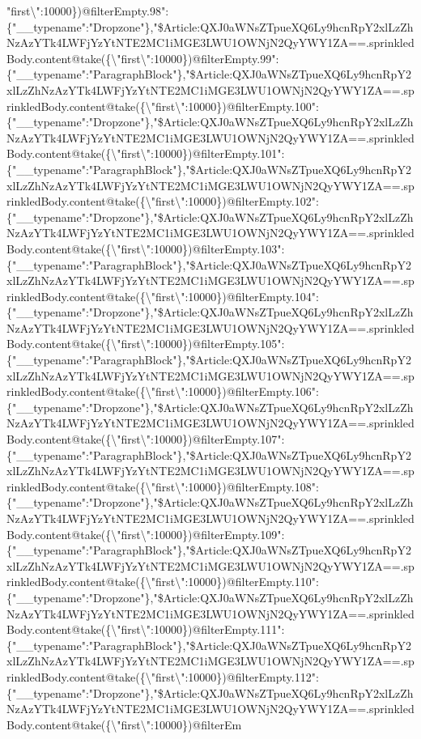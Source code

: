 "first\textbackslash{}":10000\})@filterEmpty.98":\{"\_\_typename":"Dropzone"\},"\$Article:QXJ0aWNsZTpueXQ6Ly9hcnRpY2xlLzZhNzAzYTk4LWFjYzYtNTE2MC1iMGE3LWU1OWNjN2QyYWY1ZA==.sprinkledBody.content@take(\{\textbackslash{}"first\textbackslash{}":10000\})@filterEmpty.99":\{"\_\_typename":"ParagraphBlock"\},"\$Article:QXJ0aWNsZTpueXQ6Ly9hcnRpY2xlLzZhNzAzYTk4LWFjYzYtNTE2MC1iMGE3LWU1OWNjN2QyYWY1ZA==.sprinkledBody.content@take(\{\textbackslash{}"first\textbackslash{}":10000\})@filterEmpty.100":\{"\_\_typename":"Dropzone"\},"\$Article:QXJ0aWNsZTpueXQ6Ly9hcnRpY2xlLzZhNzAzYTk4LWFjYzYtNTE2MC1iMGE3LWU1OWNjN2QyYWY1ZA==.sprinkledBody.content@take(\{\textbackslash{}"first\textbackslash{}":10000\})@filterEmpty.101":\{"\_\_typename":"ParagraphBlock"\},"\$Article:QXJ0aWNsZTpueXQ6Ly9hcnRpY2xlLzZhNzAzYTk4LWFjYzYtNTE2MC1iMGE3LWU1OWNjN2QyYWY1ZA==.sprinkledBody.content@take(\{\textbackslash{}"first\textbackslash{}":10000\})@filterEmpty.102":\{"\_\_typename":"Dropzone"\},"\$Article:QXJ0aWNsZTpueXQ6Ly9hcnRpY2xlLzZhNzAzYTk4LWFjYzYtNTE2MC1iMGE3LWU1OWNjN2QyYWY1ZA==.sprinkledBody.content@take(\{\textbackslash{}"first\textbackslash{}":10000\})@filterEmpty.103":\{"\_\_typename":"ParagraphBlock"\},"\$Article:QXJ0aWNsZTpueXQ6Ly9hcnRpY2xlLzZhNzAzYTk4LWFjYzYtNTE2MC1iMGE3LWU1OWNjN2QyYWY1ZA==.sprinkledBody.content@take(\{\textbackslash{}"first\textbackslash{}":10000\})@filterEmpty.104":\{"\_\_typename":"Dropzone"\},"\$Article:QXJ0aWNsZTpueXQ6Ly9hcnRpY2xlLzZhNzAzYTk4LWFjYzYtNTE2MC1iMGE3LWU1OWNjN2QyYWY1ZA==.sprinkledBody.content@take(\{\textbackslash{}"first\textbackslash{}":10000\})@filterEmpty.105":\{"\_\_typename":"ParagraphBlock"\},"\$Article:QXJ0aWNsZTpueXQ6Ly9hcnRpY2xlLzZhNzAzYTk4LWFjYzYtNTE2MC1iMGE3LWU1OWNjN2QyYWY1ZA==.sprinkledBody.content@take(\{\textbackslash{}"first\textbackslash{}":10000\})@filterEmpty.106":\{"\_\_typename":"Dropzone"\},"\$Article:QXJ0aWNsZTpueXQ6Ly9hcnRpY2xlLzZhNzAzYTk4LWFjYzYtNTE2MC1iMGE3LWU1OWNjN2QyYWY1ZA==.sprinkledBody.content@take(\{\textbackslash{}"first\textbackslash{}":10000\})@filterEmpty.107":\{"\_\_typename":"ParagraphBlock"\},"\$Article:QXJ0aWNsZTpueXQ6Ly9hcnRpY2xlLzZhNzAzYTk4LWFjYzYtNTE2MC1iMGE3LWU1OWNjN2QyYWY1ZA==.sprinkledBody.content@take(\{\textbackslash{}"first\textbackslash{}":10000\})@filterEmpty.108":\{"\_\_typename":"Dropzone"\},"\$Article:QXJ0aWNsZTpueXQ6Ly9hcnRpY2xlLzZhNzAzYTk4LWFjYzYtNTE2MC1iMGE3LWU1OWNjN2QyYWY1ZA==.sprinkledBody.content@take(\{\textbackslash{}"first\textbackslash{}":10000\})@filterEmpty.109":\{"\_\_typename":"ParagraphBlock"\},"\$Article:QXJ0aWNsZTpueXQ6Ly9hcnRpY2xlLzZhNzAzYTk4LWFjYzYtNTE2MC1iMGE3LWU1OWNjN2QyYWY1ZA==.sprinkledBody.content@take(\{\textbackslash{}"first\textbackslash{}":10000\})@filterEmpty.110":\{"\_\_typename":"Dropzone"\},"\$Article:QXJ0aWNsZTpueXQ6Ly9hcnRpY2xlLzZhNzAzYTk4LWFjYzYtNTE2MC1iMGE3LWU1OWNjN2QyYWY1ZA==.sprinkledBody.content@take(\{\textbackslash{}"first\textbackslash{}":10000\})@filterEmpty.111":\{"\_\_typename":"ParagraphBlock"\},"\$Article:QXJ0aWNsZTpueXQ6Ly9hcnRpY2xlLzZhNzAzYTk4LWFjYzYtNTE2MC1iMGE3LWU1OWNjN2QyYWY1ZA==.sprinkledBody.content@take(\{\textbackslash{}"first\textbackslash{}":10000\})@filterEmpty.112":\{"\_\_typename":"Dropzone"\},"\$Article:QXJ0aWNsZTpueXQ6Ly9hcnRpY2xlLzZhNzAzYTk4LWFjYzYtNTE2MC1iMGE3LWU1OWNjN2QyYWY1ZA==.sprinkledBody.content@take(\{\textbackslash{}"first\textbackslash{}":10000\})@filterEm